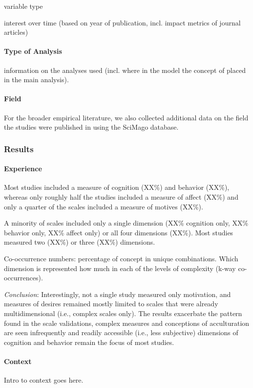 \documentclass[man, 12pt, a4paper]{apa7}
\begin{document}
variable type

interest over time (based on year of publication, incl. impact metrics of journal articles)

\paragraph{Type of Analysis}
information on the analyses used (incl. where in the model the concept of placed in the main analysis).

\paragraph{Field}
For the broader empirical literature, we also collected additional data on the field the studies were published in using the SciMago database.

\subsubsection{Results}

\paragraph{Experience}
Most studies included a measure of cognition (XX\%) and behavior (XX\%), whereas only roughly half the studies included a measure of affect (XX\%) and only a quarter of the scales included a measure of motives (XX\%).

A minority of scales included only a single dimension (XX\% cognition only, XX\% behavior only, XX\% affect only) or all four dimensions (XX\%). Most studies measured two (XX\%) or three (XX\%) dimensions.

Co-occurrence numbers: percentage of concept in unique combinations. Which dimension is represented how much in each of the levels of complexity (k-way co-occurrences).

\textit{Conclusion}: Interestingly, not a single study measured only motivation, and measures of desires remained mostly limited to scales that were already multidimensional (i.e., complex scales only). The results exacerbate the pattern found in the scale validations, complex measures and conceptions of acculturation are seen infrequently and readily accessible (i.e., less subjective) dimensions of cognition and behavior remain the focus of most studies.

\paragraph{Context}
Intro to context goes here.
\end{document}
